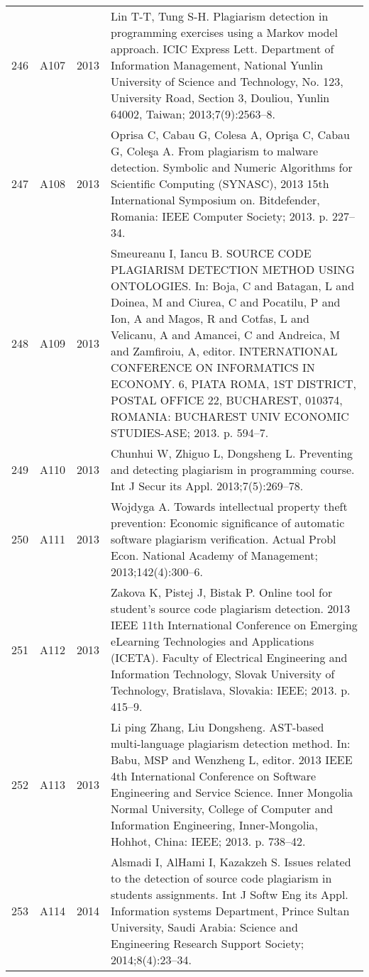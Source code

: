 \documentclass{article}\usepackage[]{graphicx}\usepackage[]{color}
\begin{document}
\begin{longtable}{l|L{1cm}|L{1cm}|L{12cm}|}
  246 & A107 & 2013 & Lin T-T, Tung S-H. Plagiarism detection in programming exercises using a Markov model approach. ICIC Express Lett. Department of Information Management, National Yunlin University of Science and Technology, No. 123, University Road, Section 3, Douliou, Yunlin 64002, Taiwan; 2013;7(9):2563–8. \\ 
  247 & A108 & 2013 & Oprisa C, Cabau G, Colesa A, Oprişa C, Cabau G, Coleşa A. From plagiarism to malware detection. Symbolic and Numeric Algorithms for Scientific Computing (SYNASC), 2013 15th International Symposium on. Bitdefender, Romania: IEEE Computer Society; 2013. p. 227–34. \\ 
  248 & A109 & 2013 & Smeureanu I, Iancu B. SOURCE CODE PLAGIARISM DETECTION METHOD USING ONTOLOGIES. In: Boja, C and Batagan, L and Doinea, M and Ciurea, C and Pocatilu, P and Ion, A and Magos, R and Cotfas, L and Velicanu, A and Amancei, C and Andreica, M and Zamfiroiu, A, editor. INTERNATIONAL CONFERENCE ON INFORMATICS IN ECONOMY. 6, PIATA ROMA, 1ST DISTRICT, POSTAL OFFICE 22, BUCHAREST, 010374, ROMANIA: BUCHAREST UNIV ECONOMIC STUDIES-ASE; 2013. p. 594–7. \\ 
  249 & A110 & 2013 & Chunhui W, Zhiguo L, Dongsheng L. Preventing and detecting plagiarism in programming course. Int J Secur its Appl. 2013;7(5):269–78. \\ 
  250 & A111 & 2013 & Wojdyga A. Towards intellectual property theft prevention: Economic significance of automatic software plagiarism verification. Actual Probl Econ. National Academy of Management; 2013;142(4):300–6. \\ 
  251 & A112 & 2013 & Zakova K, Pistej J, Bistak P. Online tool for student’s source code plagiarism detection. 2013 IEEE 11th International Conference on Emerging eLearning Technologies and Applications (ICETA). Faculty of Electrical Engineering and Information Technology, Slovak University of Technology, Bratislava, Slovakia: IEEE; 2013. p. 415–9. \\ 
  252 & A113 & 2013 & Li ping Zhang, Liu Dongsheng. AST-based multi-language plagiarism detection method. In: Babu, MSP and Wenzheng L, editor. 2013 IEEE 4th International Conference on Software Engineering and Service Science. Inner Mongolia Normal University, College of Computer and Information Engineering, Inner-Mongolia, Hohhot, China: IEEE; 2013. p. 738–42. \\ 
  253 & A114 & 2014 & Alsmadi I, AlHami I, Kazakzeh S. Issues related to the detection of source code plagiarism in students assignments. Int J Softw Eng its Appl. Information systems Department, Prince Sultan University, Saudi Arabia: Science and Engineering Research Support Society; 2014;8(4):23–34. \\ 

\end{longtable}
\end{document}
